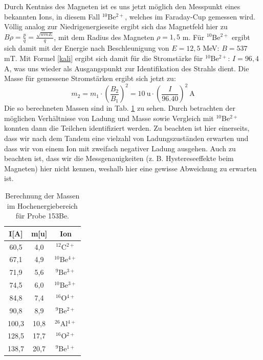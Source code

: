 Durch Kentniss des Magneten ist es uns jetzt möglich den Messpunkt eines bekannten Ions, in diesem Fall $^{10}$Be$^{2+}$, welches im Faraday-Cup gemessen wird.
Völlig analog zur Niedrigenergieseite ergibt sich das Magnetfeld hier zu $B \rho = \frac{p}{q} = \frac{\sqrt{wmE}}{q}$, mit dem Radius des Magneten $\rho = 1,5$ m.
Für $^{10}$Be$^{2+}$ ergibt sich damit mit der Energie nach Beschleunigung von $E = 12,5$ MeV: $B = 537$ mT.
Mit Formel \ref{kali} ergibt sich damit für die Stromstärke für $^{10}$Be$^{2+}$: $I = 96,4$ A, was uns wieder als Ausgangspunkt zur Identifikation des Strahls dient.
Die Masse für gemessene Stromstärken ergibt sich jetzt zu:
\begin{equation}
m_2 = m_1 \cdot \left( \frac{B_2}{B_1} \right)^2 = 10 \: \text{u} \cdot \left( \frac{I}{96.40} \right)^{2} \: \text{A}
\end{equation}
Die so berechneten Massen sind in Tab. \ref{highenergy} zu sehen.
Durch betrachten der möglichen Verhältnisse von Ladung und Masse sowie Vergleich mit $^{10}$Be$^{2+}$ konnten dann die Teilchen identifiziert werden.
Zu beachten ist hier einerseits, dass wir nach dem Tandem eine vielzahl von Ladungszuständen erwarten und dass wir von einem Ion mit zweifach negativer Ladung ausgehen.
Auch zu beachten ist, dass wir die Messgenauigkeiten (z. B. Hystereseeffekte beim Magneten) hier nicht kennen, weshalb hier eine gewisse Abweichung zu erwarten ist.

\begin{table}[h]
\centering
\caption{Berechnung der Massen im Hochenergiebereich für Probe 153Be.}
\begin{tabular}{|c |c| c|}
\hline
I[A] & m[u] & Ion \\
\hline
60,5   & 4,0   &  $^{12}$C$^{2+}$  \\
67,1   & 4,9   &  $^{10}$Be$^{4+}$ \\
71,9   & 5,6   &  $^{9}$Be$^{3+}$\\
74,5   & 6,0   &  $^{10}$Be$^{3+}$\\
84,8   & 7,4   &  $^{16}$O$^{4+}$ \\
90,8   & 8,9   &  $^{9}$Be$^{2+}$ \\
100,3 & 10,8 &  $^{26}$Al$^{4+}$\\
128,5 & 17,7 &  $^{16}$O$^{2+}$\\
138,7 & 20,7 &  $^{9}$Be$^{1+}$ \\
\hline
\end{tabular}
\label{highenergy}
\end{table}

